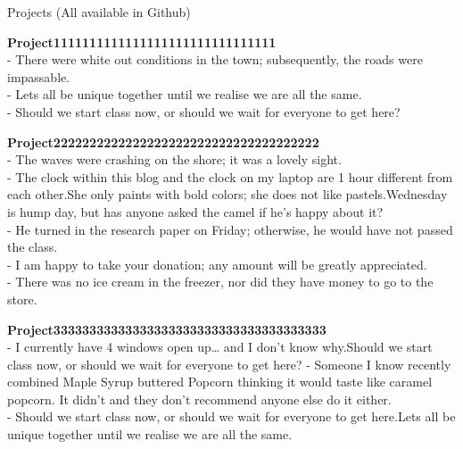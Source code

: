 \documentclass{cv-2020-soft-dev} %
\begin{document}
\begin{rSection}{Projects (All available in Github)}

{\bf Project1111111111111111111111111111111}
\\- There were white out conditions in the town; subsequently, the roads were impassable.
\\- Lets all be unique together until we realise we are all the same.
\\- Should we start class now, or should we wait for everyone to get here?

{\bf Project2222222222222222222222222222222222222}
\\- The waves were crashing on the shore; it was a lovely sight.
\\- The clock within this blog and the clock on my laptop are 1 hour different from each other.She only paints with bold colors; she does not like pastels.Wednesday is hump day, but has anyone asked the camel if he’s happy about it?
\\- He turned in the research paper on Friday; otherwise, he would have not passed the class.
\\- I am happy to take your donation; any amount will be greatly appreciated.
\\- There was no ice cream in the freezer, nor did they have money to go to the store.

{\bf Project33333333333333333333333333333333333333}
\\- I currently have 4 windows open up… and I don’t know why.Should we start class now, or should we wait for everyone to get here?
- Someone I know recently combined Maple Syrup  buttered Popcorn thinking it would taste like caramel popcorn. It didn’t and they don’t recommend anyone else do it either.
\\- Should we start class now, or should we wait for everyone to get here.Lets all be unique together until we realise we are all the same.



\end{rSection}
\end{document}
